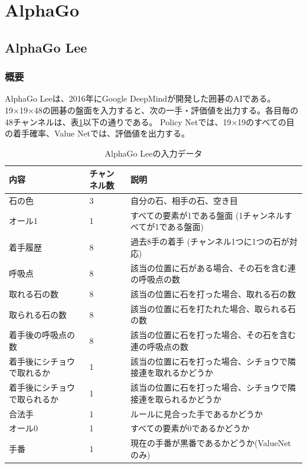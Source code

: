 \documentclass{ltjsarticle}
\begin{document}
\clearpage

\section{AlphaGo}
\subsection{AlphaGo Lee}
\subsubsection{概要}
AlphaGo Leeは、2016年にGoogle DeepMindが開発した囲碁のAIである。19×19×48の囲碁の盤面を入力すると、次の一手・評価値を出力する。各目毎の48チャンネルは、表\ref{tab:AlphaGo_Lee}以下の通りである。
Policy Netでは、19×19のすべての目の着手確率、Value Netでは、評価値を出力する。

\begin{table}
  \centering
  \begin{tabular}{lll}
    \hline
    内容 & チャンネル数 & 説明 \\
    \hline
    石の色 & 3 & 自分の石、相手の石、空き目 \\
    オール1 & 1 & すべての要素が1である盤面 (1チャンネルすべてが1である盤面) \\
    着手履歴 & 8 & 過去8手の着手 (チャンネル1つに1つの石が対応) \\
    呼吸点 & 8 & 該当の位置に石がある場合、その石を含む連の呼吸点の数 \\
    取れる石の数 & 8 & 該当の位置に石を打った場合、取れる石の数 \\
    取られる石の数 & 8 & 該当の位置に石を打たれた場合、取られる石の数 \\
    着手後の呼吸点の数 & 8 & 該当の位置に石を打った場合、その石を含む連の呼吸点の数 \\
    着手後にシチョウで取れるか & 1 & 該当の位置に石を打った場合、シチョウで隣接連を取れるかどうか \\
    着手後にシチョウで取られるか & 1 & 該当の位置に石を打った場合、シチョウで隣接連を取られるかどうか \\
    合法手 & 1 & ルールに見合った手であるかどうか \\
    オール0 & 1 & すべての要素が0であるかどうか \\
    手番 & 1 & 現在の手番が黒番であるかどうか(ValueNetのみ) \\
    \hline
  \end{tabular}
  \caption{AlphaGo Leeの入力データ}
  \label{tab:AlphaGo_Lee}
\end{table}
\end{document}
